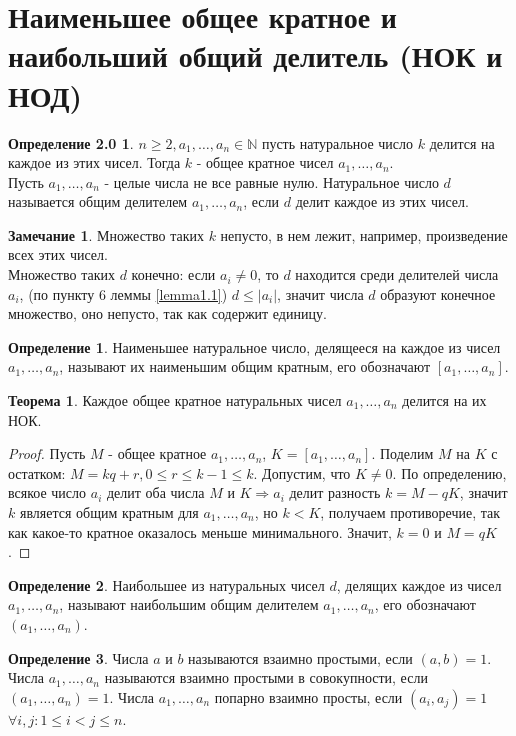 \documentclass[a4paper, 12pt]{article}
\theoremstyle{definition}
\newtheorem{definition}{Определение}[section]
\newtheorem{theorem}{Теорема}[section]
\newtheorem*{comm}{Замечание}
\newtheorem*{def20}{Определение 2.0}
\begin{document}
    \section{Наименьшее общее кратное и наибольший общий делитель (НОК и НОД)}
    \begin{def20}
         $n\geq 2, a_1, \dots, a_n \in \mathbb{N}$ пусть натуральное число $k$ делится на каждое из этих чисел. Тогда $k$ - общее кратное чисел $a_1, \dots, a_n$. \\
        Пусть $a_1, \dots, a_n$ - целые числа не все равные нулю. Натуральное число $d$ называется общим делителем $a_1, \dots, a_n$, если $d$ делит каждое из этих чисел.
    \end{def20}
    \begin{comm}
        Множество таких $k$ непусто, в нем лежит, например, произведение всех этих чисел. \\ Множество таких $d$ конечно: если $a_i\ne 0$, то $d$ находится среди делителей числа $a_i$, (по пункту 6 леммы \ref{lemma1.1}) $d\leq |a_i|$, значит числа $d$ образуют конечное множество, оно непусто, так как содержит единицу.
    \end{comm}
    \begin{definition}
        Наименьшее натуральное число, делящееся на каждое из чисел $a_1, \dots, a_n$, называют их наименьшим общим кратным, его обозначают $[a_1, \dots, a_n]$.
    \end{definition}
    \begin{theorem} \label{th2.1}
        Каждое общее кратное натуральных чисел $a_1, \dots, a_n$ делится на их НОК.
    \end{theorem}
    \begin{proof}
        Пусть $M$ - общее кратное $a_1, \dots, a_n$, $K=[a_1, \dots, a_n]$. Поделим $M$ на $K$ с остатком: $M=kq+r, 0\leq r\leq k-1\leq k$. Допустим, что $K\ne 0$. По определению, всякое число $a_i$ делит оба числа $M$ и $K \Rightarrow a_i$ делит разность $k=M-qK$, значит $k$ является общим кратным для $a_1, \dots, a_n$, но $k<K$, получаем противоречие, так как какое-то кратное оказалось меньше минимального. Значит, $k=0$ и $M=qK$.  
    \end{proof}
    \begin{definition}
        Наибольшее из натуральных чисел $d$, делящих каждое из чисел $a_1, \dots, a_n$, называют наибольшим общим делителем $a_1, \dots, a_n$, его обозначают $(a_1, \dots, a_n)$.
    \end{definition}
    \begin{definition}
        Числа $a$ и $b$ называются взаимно простыми, если $(a,b)=1$. Числа $a_1, \dots, a_n$ называются взаимно простыми в совокупности, если \\ $(a_1, \dots, a_n)=1$. Числа $a_1, \dots, a_n$ попарно взаимно просты, если $(a_i,a_j)=1$ $\forall i,j: 1\leq i<j\leq n$.
    \end{definition}
\end{document}
